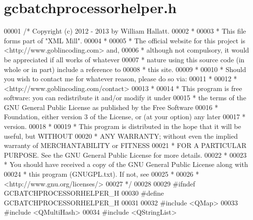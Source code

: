\hypertarget{gcbatchprocessorhelper_8h_source}{\section{gcbatchprocessorhelper.\-h}
}

\begin{DoxyCode}
00001 \textcolor{comment}{/* Copyright (c) 2012 - 2013 by William Hallatt.}
00002 \textcolor{comment}{ *}
00003 \textcolor{comment}{ * This file forms part of "XML Mill".}
00004 \textcolor{comment}{ *}
00005 \textcolor{comment}{ * The official website for this project is <http://www.goblincoding.com> and,}
00006 \textcolor{comment}{ * although not compulsory, it would be appreciated if all works of whatever}
00007 \textcolor{comment}{ * nature using this source code (in whole or in part) include a reference to}
00008 \textcolor{comment}{ * this site.}
00009 \textcolor{comment}{ *}
00010 \textcolor{comment}{ * Should you wish to contact me for whatever reason, please do so via:}
00011 \textcolor{comment}{ *}
00012 \textcolor{comment}{ *                 <http://www.goblincoding.com/contact>}
00013 \textcolor{comment}{ *}
00014 \textcolor{comment}{ * This program is free software: you can redistribute it and/or modify it
       under}
00015 \textcolor{comment}{ * the terms of the GNU General Public License as published by the Free
       Software}
00016 \textcolor{comment}{ * Foundation, either version 3 of the License, or (at your option) any later}
00017 \textcolor{comment}{ * version.}
00018 \textcolor{comment}{ *}
00019 \textcolor{comment}{ * This program is distributed in the hope that it will be useful, but WITHOUT}
00020 \textcolor{comment}{ * ANY WARRANTY; without even the implied warranty of MERCHANTABILITY or
       FITNESS}
00021 \textcolor{comment}{ * FOR A PARTICULAR PURPOSE.  See the GNU General Public License for more
       details.}
00022 \textcolor{comment}{ *}
00023 \textcolor{comment}{ * You should have received a copy of the GNU General Public License along with}
00024 \textcolor{comment}{ * this program (GNUGPL.txt).  If not, see}
00025 \textcolor{comment}{ *}
00026 \textcolor{comment}{ *                    <http://www.gnu.org/licenses/>}
00027 \textcolor{comment}{ */}
00028 
00029 \textcolor{preprocessor}{#ifndef GCBATCHPROCESSORHELPER\_H}
00030 \textcolor{preprocessor}{}\textcolor{preprocessor}{#define GCBATCHPROCESSORHELPER\_H}
00031 \textcolor{preprocessor}{}
00032 \textcolor{preprocessor}{#include <QMap>}
00033 \textcolor{preprocessor}{#include <QMultiHash>}
00034 \textcolor{preprocessor}{#include <QStringList>}

\end{DoxyCode}
